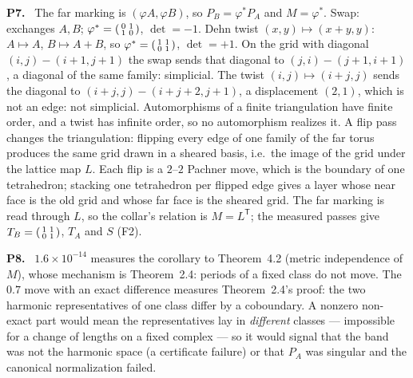 \documentclass[11pt]{article}
\newenvironment{solution}[1]{\medskip\noindent\textbf{P#1.}\ }{\par\medskip}
\begin{document}
\begin{solution}{7}
The far marking is $(\varphi A,\varphi B)$, so $P_B = \varphi^*P_A$ and $M = \varphi^*$.
Swap: exchanges $A,B$; $\varphi^* = \begin{psmallmatrix}0&1\\1&0\end{psmallmatrix}$,
$\det=-1$. Dehn twist $(x,y)\mapsto(x+y,y)$: $A\mapsto A$, $B\mapsto A+B$, so
$\varphi^* = \begin{psmallmatrix}1&1\\0&1\end{psmallmatrix}$, $\det=+1$. On the grid
with diagonal $(i,j)\!-\!(i{+}1,j{+}1)$ the swap sends that diagonal to
$(j,i)\!-\!(j{+}1,i{+}1)$, a diagonal of the same family: simplicial. The twist
$(i,j)\mapsto(i{+}j,j)$ sends the diagonal to $(i{+}j,j)\!-\!(i{+}j{+}2,j{+}1)$, a
displacement $(2,1)$, which is not an edge: not simplicial. Automorphisms of a
finite triangulation have finite order, and a twist has infinite order, so no
automorphism realizes it. A flip pass changes the triangulation: flipping every
edge of one family of the far torus produces the same grid drawn in a sheared
basis, i.e.\ the image of the grid under the lattice map $L$. Each flip is a
$2$--$2$ Pachner move, which is the boundary of one tetrahedron; stacking one
tetrahedron per flipped edge gives a layer whose near face is the old grid and
whose far face is the sheared grid. The far marking is read through $L$, so the
collar's relation is $M = L^{\mathsf T}$; the measured passes give
$T_B = \begin{psmallmatrix}1&1\\0&1\end{psmallmatrix}$, $T_A$ and $S$ (F2).
\end{solution}

\begin{solution}{8}
$1.6\times10^{-14}$ measures the corollary to Theorem~4.2 (metric independence
of $M$), whose mechanism is Theorem~2.4: periods of a fixed class do not move.
The $0.7$ move with an exact difference measures Theorem~2.4's proof: the two
harmonic representatives of one class differ by a coboundary. A nonzero
non-exact part would mean the representatives lay in \emph{different} classes
--- impossible for a change of lengths on a fixed complex --- so it would
signal that the band was not the harmonic space (a certificate failure) or
that $P_A$ was singular and the canonical normalization failed.
\end{solution}
\end{document}
